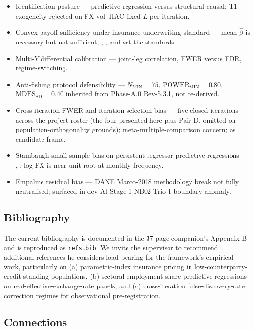 \begin{itemize}
  \item Identification posture --- predictive-regression versus structural-causal; T1 exogeneity rejected on FX-vol; HAC fixed-\(L\) per iteration.
  \item Convex-payoff sufficiency under insurance-underwriting standard --- mean-\(\hat{\beta}\) is necessary but not sufficient; \citet{carter_etal_2017}, \citet{mahul_stutley_2010}, and \citet{clarke_2016} set the standards.
  \item Multi-\(Y\) differential calibration --- joint-leg correlation, FWER versus FDR, regime-switching.
  \item Anti-fishing protocol defensibility --- \(N_{\mathrm{MIN}}=75\), \(\mathrm{POWER}_{\mathrm{MIN}}=0.80\), \(\mathrm{MDES}_{\mathrm{SD}}=0.40\) inherited from Phase-A.0 Rev-5.3.1, not re-derived.
  \item Cross-iteration FWER and iteration-selection bias --- five closed iterations across the project roster (the four presented here plus Pair D, omitted on population-orthogonality grounds); meta-multiple-comparison concern; \citet{heckman_1979} as candidate frame.
  \item Stambaugh small-sample bias on persistent-regressor predictive regressions --- \citet{stambaugh1999}, \citet{phillips2014}; log-FX is near-unit-root at monthly frequency.
  \item Empalme residual bias --- DANE Marco-2018 methodology break not fully neutralised; surfaced in dev-AI Stage-1 NB02 Trio 1 boundary anomaly.
\end{itemize}

\subsection{Bibliography}\label{sec:4-bib}

The current bibliography is documented in the 37-page companion's Appendix B and is reproduced as \texttt{refs.bib}. We invite the supervisor to recommend additional references he considers load-bearing for the framework's empirical work, particularly on (a) parametric-index insurance pricing in low-counterparty-credit-standing populations, (b) sectoral employment-share predictive regressions on real-effective-exchange-rate panels, and (c) cross-iteration false-discovery-rate correction regimes for observational pre-registration.

\subsection{Connections}\label{sec:4-connections}

